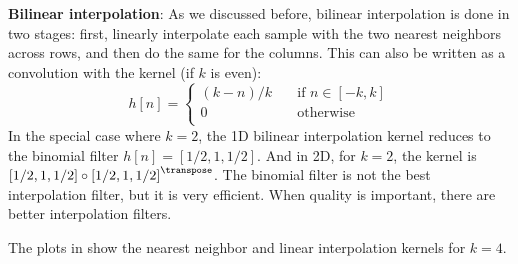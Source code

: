{\bf Bilinear interpolation}: As we discussed before, bilinear interpolation is done in two stages: first, linearly interpolate each sample with the two nearest neighbors across rows, and then do the same for the columns. This can also be written as a convolution with the kernel (if $k$ is even):
\begin{equation}
	h  \left[n\right] =  \begin{cases}
		(k-n)/k & \quad \text{if }  n \in \left[-k, k\right] \\
		0       & \quad \text{otherwise }                    \\
	\end{cases}
\end{equation}
In the special case where $k=2$, the 1D bilinear interpolation kernel reduces to the binomial filter $h[n] = \left[1/2,1,1/2\right]$. And in 2D, for $k=2$, the kernel is $\left[1/2,1,1/2\right] \circ \left[1/2,1,1/2\right]^\transpose$. The binomial filter is not the best interpolation filter, but it is very efficient. When quality is important, there are better interpolation filters.

The  plots in \fig{\ref{fig:bilinear_interp_k4}} show the nearest neighbor and linear interpolation kernels for $k=4$.

